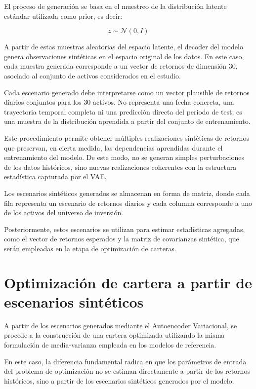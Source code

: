 El proceso de generación se basa en el muestreo de la distribución latente estándar utilizada como prior, es decir:

\begin{equation}
z \sim \mathcal{N}(0, I)
\end{equation}

A partir de estas muestras aleatorias del espacio latente, el decoder del modelo genera observaciones sintéticas en el espacio original de los datos. En este caso, cada muestra generada corresponde a un vector de retornos de dimensión 30, asociado al conjunto de activos considerados en el estudio.

Cada escenario generado debe interpretarse como un vector plausible de retornos diarios conjuntos para los 30 activos. No representa una fecha concreta, una trayectoria temporal completa ni una predicción directa del periodo de test; es una muestra de la distribución aprendida a partir del conjunto de entrenamiento.

Este procedimiento permite obtener múltiples realizaciones sintéticas de retornos que preservan, en cierta medida, las dependencias aprendidas durante el entrenamiento del modelo. De este modo, no se generan simples perturbaciones de los datos históricos, sino nuevas realizaciones coherentes con la estructura estadística capturada por el VAE.

Los escenarios sintéticos generados se almacenan en forma de matriz, donde cada fila representa un escenario de retornos diarios y cada columna corresponde a uno de los activos del universo de inversión.

Posteriormente, estos escenarios se utilizan para estimar estadísticas agregadas, como el vector de retornos esperados y la matriz de covarianzas sintética, que serán empleadas en la etapa de optimización de carteras.

\section{Optimización de cartera a partir de escenarios sintéticos}

A partir de los escenarios generados mediante el Autoencoder Variacional, se procede a la construcción de una cartera optimizada utilizando la misma formulación de media-varianza empleada en los modelos de referencia.

En este caso, la diferencia fundamental radica en que los parámetros de entrada del problema de optimización no se estiman directamente a partir de los retornos históricos, sino a partir de los escenarios sintéticos generados por el modelo.

